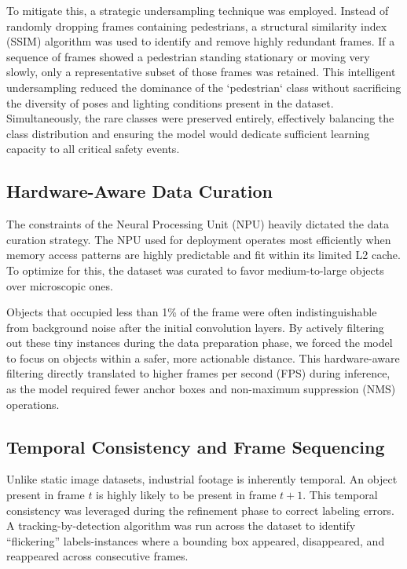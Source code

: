 To mitigate this, a strategic undersampling technique was employed. Instead of randomly dropping frames containing pedestrians, a structural similarity index (SSIM) algorithm was used to identify and remove highly redundant frames. If a sequence of frames showed a pedestrian standing stationary or moving very slowly, only a representative subset of those frames was retained. This intelligent undersampling reduced the dominance of the `pedestrian` class without sacrificing the diversity of poses and lighting conditions present in the dataset. Simultaneously, the rare classes were preserved entirely, effectively balancing the class distribution and ensuring the model would dedicate sufficient learning capacity to all critical safety events.

\subsection{Hardware-Aware Data Curation}
The constraints of the Neural Processing Unit (NPU) heavily dictated the data curation strategy. The NPU used for deployment operates most efficiently when memory access patterns are highly predictable and fit within its limited L2 cache. To optimize for this, the dataset was curated to favor medium-to-large objects over microscopic ones. 

Objects that occupied less than 1\% of the frame were often indistinguishable from background noise after the initial convolution layers. By actively filtering out these tiny instances during the data preparation phase, we forced the model to focus on objects within a safer, more actionable distance. This hardware-aware filtering directly translated to higher frames per second (FPS) during inference, as the model required fewer anchor boxes and non-maximum suppression (NMS) operations.

\subsection{Temporal Consistency and Frame Sequencing}
Unlike static image datasets, industrial footage is inherently temporal. An object present in frame $t$ is highly likely to be present in frame $t+1$. This temporal consistency was leveraged during the refinement phase to correct labeling errors. A tracking-by-detection algorithm was run across the dataset to identify ``flickering'' labels-instances where a bounding box appeared, disappeared, and reappeared across consecutive frames. 

